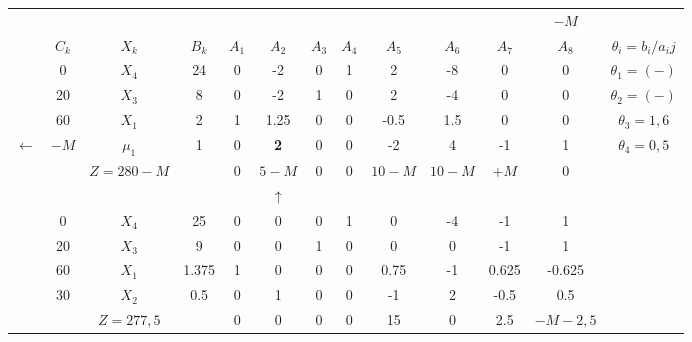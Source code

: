     \begin{tabular}{ccccccccccccc}
\cline{2-13}            &         &         &         &         &         &         &         &         &         &         & $-M$    &  \bigstrut[t]\\
            & $C_k$   & $X_k$   & $B_k$   & $A_1$   & $A_2$   & $A_3$   & $A_4$   & $A_5$   & $A_6$   & $A_7$   & $A_8$   & $\theta_i = b_i/a_ij$ \bigstrut[b]\\
\cline{2-13}            & 0       & $X_4$   & 24      & 0       & -2      & 0       & 1       & 2       & -8      & 0       & 0       & $\theta_1 = (-)$ \bigstrut[t]\\
            & 20      & $X_3$   & 8       & 0       & -2      & 1       & 0       & 2       & -4      & 0       & 0       & $\theta_2 = (-)$ \\
            & 60      & $X_1$   & 2       & 1       & 1.25    & 0       & 0       & -0.5    & 1.5     & 0       & 0       & $\theta_3 = 1,6$ \\
    $\leftarrow$ & $-M$    & \textcolor[rgb]{ 1,  0,  0}{\boldmath{}\textbf{$\mu_1$}\unboldmath{}} & 1       & 0       & \textbf{2} & 0       & 0       & -2      & 4       & -1      & 1       & \boldmath{}\textbf{$\theta_4 = 0,5$}\unboldmath{} \bigstrut[b]\\
\cline{2-13}            &         & $Z=280-M$ &         & 0       & \textcolor[rgb]{ 0,  .439,  .753}{\boldmath{}\textbf{$5-M$}\unboldmath{}} & 0       & 0       & $10-M$  & $10-M$  & $+M$    & 0       &  \bigstrut\\
\cline{2-13}            &         &         &         &         & $\uparrow$ &         &         &         &         &         &         &  \bigstrut\\
\cline{2-13}            & 0       & $X_4$   & 25      & 0       & 0       & 0       & 1       & 0       & -4      & -1      & 1       &  \bigstrut[t]\\
            & 20      & $X_3$   & 9       & 0       & 0       & 1       & 0       & 0       & 0       & -1      & 1       &  \\
            & 60      & $X_1$   & 1.375   & 1       & 0       & 0       & 0       & 0.75    & -1      & 0.625   & -0.625  &  \\
            & 30      & $X_2$   & 0.5     & 0       & 1       & 0       & 0       & -1      & 2       & -0.5    & 0.5     &  \bigstrut[b]\\
\cline{2-12}            &         & $Z=277,5$ &         & 0       & 0       & 0       & 0       & 15      & 0       & 2.5     & $-M-2,5$ &  \bigstrut\\
\cline{2-12}    \end{tabular}%
